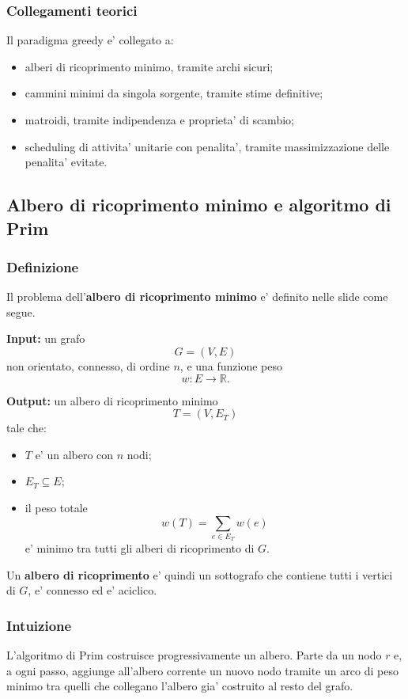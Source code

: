 \subsubsection{Collegamenti teorici}
Il paradigma greedy e' collegato a:
\begin{itemize}
	\item alberi di ricoprimento minimo, tramite archi sicuri;
	\item cammini minimi da singola sorgente, tramite stime definitive;
	\item matroidi, tramite indipendenza e proprieta' di scambio;
	\item scheduling di attivita' unitarie con penalita', tramite massimizzazione delle penalita' evitate.
\end{itemize}

\subsection{Albero di ricoprimento minimo e algoritmo di Prim}

\subsubsection{Definizione}
Il problema dell'\textbf{albero di ricoprimento minimo} e' definito nelle slide come segue.

\textbf{Input:} un grafo
\[
G=(V,E)
\]
non orientato, connesso, di ordine $n$, e una funzione peso
\[
w:E\to\mathbb{R}.
\]

\textbf{Output:} un albero di ricoprimento minimo
\[
T=(V,E_T)
\]
tale che:
\begin{itemize}
	\item $T$ e' un albero con $n$ nodi;
	\item $E_T\subseteq E$;
	\item il peso totale
	\[
	w(T)=\sum_{e\in E_T} w(e)
	\]
	e' minimo tra tutti gli alberi di ricoprimento di $G$.
\end{itemize}

Un \textbf{albero di ricoprimento} e' quindi un sottografo che contiene tutti i vertici di $G$, e' connesso ed e' aciclico.

\subsubsection{Intuizione}
L'algoritmo di Prim costruisce progressivamente un albero. Parte da un nodo $r$ e, a ogni passo, aggiunge all'albero corrente un nuovo nodo tramite un arco di peso minimo tra quelli che collegano l'albero gia' costruito al resto del grafo.

